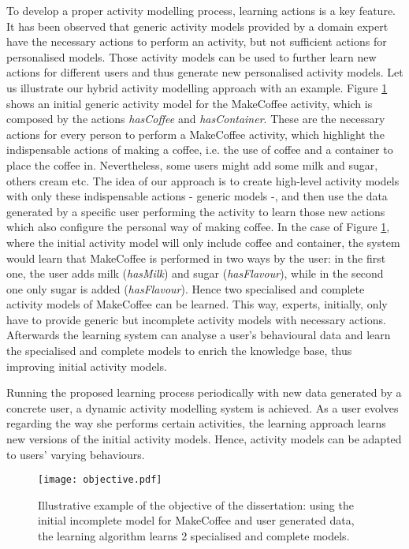 To develop a proper activity modelling process, learning actions is a key feature. It has been observed that generic activity models provided by a domain expert have the necessary actions to perform an activity, but not sufficient actions for personalised models. Those activity models can be used to further learn new actions for different users and thus generate new personalised activity models. Let us illustrate our hybrid activity modelling approach with an example. Figure \ref{fig-objective} shows an initial generic activity model for the MakeCoffee activity, which is composed by the actions \textit{hasCoffee} and \textit{hasContainer}. These are the necessary actions for every person to perform a MakeCoffee activity, which highlight the indispensable actions of making a coffee, i.e. the use of coffee and a container to place the coffee in. Nevertheless, some users might add some milk and sugar, others cream etc. The idea of our approach is to create high-level activity models with only these indispensable actions - generic models -, and then use the data generated by a specific user performing the activity to learn those new actions which also configure the personal way of making coffee. In the case of Figure \ref{fig-objective}, where the initial activity model will only include coffee and container, the system would learn that MakeCoffee is performed in two ways by the user: in the first one, the user adds milk (\textit{hasMilk}) and sugar (\textit{hasFlavour}), while in the second one only sugar is added (\textit{hasFlavour}). Hence two specialised and complete activity models of MakeCoffee can be learned. This way, experts, initially, only have to provide generic but incomplete activity models with necessary actions. Afterwards the learning system can analyse a user's behavioural data and learn the specialised and complete models to enrich the knowledge base, thus improving initial activity models.

Running the proposed learning process periodically with new data generated by a concrete user, a dynamic activity modelling system is achieved. As a user evolves regarding the way she performs certain activities, the learning approach learns new versions of the initial activity models. Hence, activity models can be adapted to users' varying behaviours.

\begin{figure}[htbp]
\centering
\texttt{[image: objective.pdf]}
    \caption{Illustrative example of the objective of the dissertation: using the initial incomplete model for MakeCoffee and user generated data, the learning algorithm learns 2 specialised and complete models.}
    \label{fig-objective}
\end{figure}

